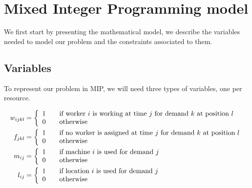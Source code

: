 \documentclass[../../thesis.tex]{subfiles}
\begin{document}
\section{Mixed Integer Programming model}
\label{section:mipmodel}

We first start by presenting the mathematical model, we describe the variables
needed to model our problem and the constraints associated to them.

\subsection{Variables}

To represent our problem in MIP, we will need three types of variables, one per resource.



\begin{equation*}
\begin{split}
    w_{ijkl} &=  \left \{
                   \begin{array}{l l}
                      1 \quad & \textrm{if worker $i$ is working at time $j$ for demand $k$ at position $l$} \\
                      0 \quad & \textrm{otherwise} 
                   \end{array}
                   \right . \\
  f_{jkl} &=  \left \{
  \begin{array}{l l}
      1 \quad & \textrm{if no worker is assigned at time $j$ for demand $k$ at position $l$} \\
      0 \quad & \textrm{otherwise} 
  \end{array}
  \right . \\
   m_{ij} &=  \left \{
                   \begin{array}{l l}
                      1 \quad & \textrm{if machine $i$ is used for demand $j$} \\
                      0 \quad & \textrm{otherwise} 
                   \end{array}
                   \right . \\
    l_{ij} &= \left \{
               \begin{array}{l l}
                  1 \quad & \textrm{if location $i$ is used for demand $j$} \\
                  0 \quad & \textrm{otherwise} 
               \end{array}
               \right . \\
\end{split}
\end{equation*}
\end{document}
